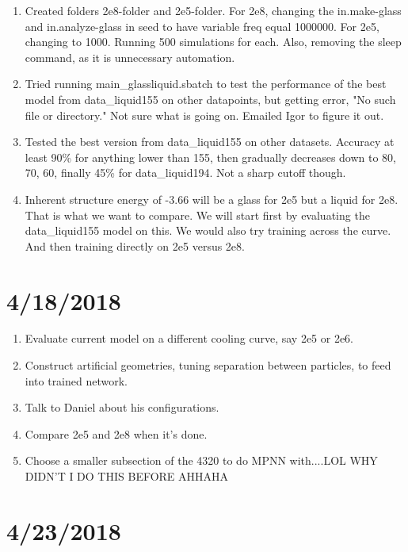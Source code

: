 \documentclass[12pt,reqno]{amsart}
\numberwithin{equation}{section}
\begin{document}
\begin{enumerate}
\item Created folders 2e8-folder and 2e5-folder.  For 2e8, changing the in.make-glass and in.analyze-glass in seed to have variable freq equal 1000000.  For 2e5, changing to 1000.    Running 500 simulations for each.  Also, removing the sleep command, as it is unnecessary automation.  

\item Tried running main\_glassliquid.sbatch to test the performance of the best model from data\_liquid155 on other datapoints, but getting error, "No such file or directory."  Not sure what is going on.  Emailed Igor to figure it out. 

\item Tested the best version from data\_liquid155 on other datasets.  Accuracy at least 90\% for anything lower than 155, then gradually decreases down to 80, 70, 60, finally 45\% for data\_liquid194.  Not a sharp cutoff though.  

\item Inherent structure energy of -3.66 will be a glass for 2e5 but a liquid for 2e8.  That is what we want to compare.  We will start first by evaluating the data\_liquid155 model on this.  We would also try training across the curve.  And then training directly on 2e5 versus 2e8.   




\end{enumerate}

\section{4/18/2018}

\begin{enumerate}
\item Evaluate current model on a different cooling curve, say 2e5 or 2e6.  
\item Construct artificial geometries, tuning separation between particles, to feed into trained network.
\item Talk to Daniel about his configurations.
\item Compare 2e5 and 2e8 when it's done.
\item Choose a smaller subsection of the 4320 to do MPNN with....LOL WHY DIDN'T I DO THIS BEFORE AHHAHA
\end{enumerate}

\section{4/23/2018}
\end{document}
